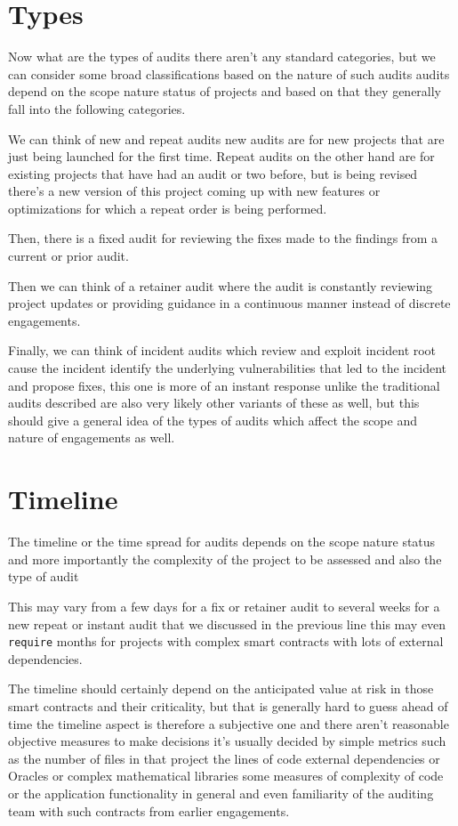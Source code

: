 \section{Types}

Now what are the types of audits there aren't any standard categories, but we can consider some broad classifications based on the nature of such audits audits depend on the scope nature status of projects and based on that they generally fall into the following categories. 

We can think of new and repeat audits new audits are for new projects that are just being launched for the first time. Repeat audits on the other hand are for existing projects that have had an audit or two before, but is being revised there's a new version of this project coming up with new features or optimizations for which a repeat order is being performed.

Then, there is a fixed audit for reviewing the fixes made to the findings from a current or prior audit. 

Then we can think of a retainer audit where the audit is constantly reviewing project updates or providing guidance in a continuous manner instead of discrete engagements. 

Finally, we can think of incident audits which review and exploit incident root cause the incident identify the underlying vulnerabilities that led to the incident and propose fixes, this one is more of an instant response unlike the traditional audits described are also very likely other variants of these as well, but this should give a general idea of the types of audits which affect the scope and nature of engagements as well.

\section{Timeline}

The timeline or the time spread for audits depends on the scope nature status and more importantly the complexity of the project to be assessed and also the type of audit 

This may vary from a few days for a fix or retainer audit to several weeks for a new repeat or instant audit that we discussed in the previous line this may even \verb|require| months for projects with complex smart contracts with lots of external dependencies. 

The timeline should certainly depend on the anticipated value at risk in those smart contracts and their criticality, but that is generally hard to guess ahead of time the timeline aspect is therefore a subjective one and there aren't reasonable objective measures to make decisions it's usually decided by simple metrics such as the number of files in that project the lines of code external dependencies or Oracles or complex mathematical libraries some measures of complexity of code or the application functionality in general and even familiarity of the auditing team with such contracts from earlier engagements.

